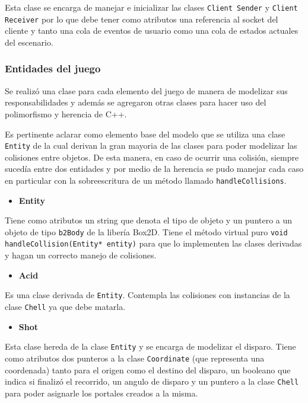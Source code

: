 \documentclass[a4paper]{article}
\begin{document}
Esta clase se encarga de manejar e inicializar las clases \texttt{Client Sender} y \texttt{Client Receiver} por lo que debe tener como atributos una referencia al socket del cliente y tanto una cola de eventos de usuario como una cola de estados actuales del escenario.
	
\subsubsection{Entidades del juego}

Se realizó una clase para cada elemento del juego de manera de modelizar sus responsabilidades y además se agregaron otras clases para hacer uso del polimorfismo y herencia de C++.

Es pertinente aclarar como elemento base del modelo que se utiliza una clase \texttt{Entity} de la cual derivan la gran mayoria de las clases para poder modelizar las colisiones entre objetos. De esta manera, en caso de ocurrir una colisión, siempre sucedía entre dos entidades y por medio de la herencia se pudo manejar cada caso en particular con la sobreescritura de un método llamado \texttt{handleCollisions}. 

\begin{itemize}
	\item \textbf{Entity}
\end{itemize}

Tiene como atributos un string que denota el tipo de objeto y un puntero a un objeto de tipo \texttt{b2Body} de la libería Box2D. Tiene el método virtual puro \texttt{void handleCollision(Entity* entity)} para que lo implementen las clases derivadas y hagan un correcto manejo de colisiones.

\begin{itemize}
	\item \textbf{Acid}
\end{itemize}

Es una clase derivada de \texttt{Entity}. Contempla las colisiones con instancias de la clase \texttt{Chell} ya que debe matarla.

\begin{itemize}
	\item \textbf{Shot}
\end{itemize}

Esta clase hereda de la clase \texttt{Entity} y se encarga de modelizar el disparo. Tiene como atributos dos punteros a la clase \texttt{Coordinate} (que representa una coordenada) tanto para el origen como el destino del disparo, un booleano que indica si finalizó el recorrido, un angulo de disparo y un puntero a la clase \texttt{Chell} para poder asignarle los portales creados a la misma.
\end{document}
